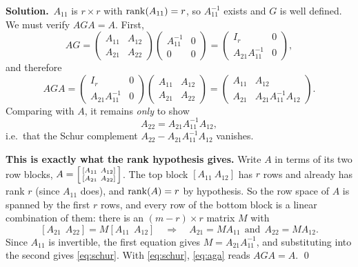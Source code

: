 \documentclass[11pt]{article}
\newcommand{\sol}{\smallskip\noindent\textbf{\color{ForestGreen}Solution.}\ }
\begin{document}
\sol $A_{11}$ is $r\times r$ with $\operatorname{rank}(A_{11})=r$, so $A_{11}^{-1}$ exists and $G$ is well
defined. We must verify $AGA=A$. First,
\[
  AG=\begin{pmatrix}A_{11}&A_{12}\\A_{21}&A_{22}\end{pmatrix}
     \begin{pmatrix}A_{11}^{-1}&0\\0&0\end{pmatrix}
   =\begin{pmatrix}I_r&0\\A_{21}A_{11}^{-1}&0\end{pmatrix},
\]
and therefore
\begin{equation}\label{eq:aga}
  AGA=\begin{pmatrix}I_r&0\\A_{21}A_{11}^{-1}&0\end{pmatrix}
      \begin{pmatrix}A_{11}&A_{12}\\A_{21}&A_{22}\end{pmatrix}
    =\begin{pmatrix}A_{11}&A_{12}\\A_{21}&A_{21}A_{11}^{-1}A_{12}\end{pmatrix}.
\end{equation}
Comparing with $A$, it remains \emph{only} to show
\begin{equation}\label{eq:schur}
  A_{22}=A_{21}A_{11}^{-1}A_{12},
\end{equation}
i.e.\ that the Schur complement $A_{22}-A_{21}A_{11}^{-1}A_{12}$ vanishes.

\textbf{This is exactly what the rank hypothesis gives.} Write $A$ in terms of its two row
blocks, $A=\begin{bsmallmatrix}[A_{11}\ A_{12}]\\ [A_{21}\ A_{22}]\end{bsmallmatrix}$. The
top block $[A_{11}\ A_{12}]$ has $r$ rows and already has rank $r$ (since $A_{11}$ does), and
$\operatorname{rank}(A)=r$ by hypothesis. So the row space of $A$ is spanned by the first $r$ rows, and
every row of the bottom block is a linear combination of them: there is an
$(m-r)\times r$ matrix $M$ with
\[
  [A_{21}\ \ A_{22}]=M[A_{11}\ \ A_{12}]
  \quad\Longrightarrow\quad
  A_{21}=MA_{11}\ \ \text{and}\ \ A_{22}=MA_{12}.
\]
Since $A_{11}$ is invertible, the first equation gives $M=A_{21}A_{11}^{-1}$, and
substituting into the second gives \eqref{eq:schur}. With \eqref{eq:schur},
\eqref{eq:aga} reads $AGA=A$. \qed
\end{document}
